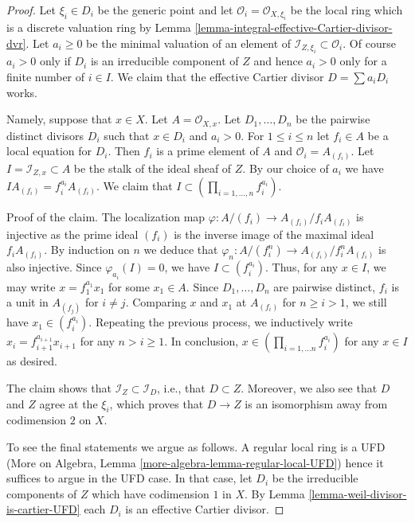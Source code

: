 \documentclass[10pt,a4paper]{amsart}
\theoremstyle{plain}
\theoremstyle{definition}
\theoremstyle{remark}
\numberwithin{equation}{subsection}
\begin{document}
\begin{proof}
Let $\xi_i \in D_i$ be the generic point and let
$\mathcal{O}_i = \mathcal{O}_{X, \xi_i}$ be the local ring
which is a discrete valuation ring by
Lemma \ref{lemma-integral-effective-Cartier-divisor-dvr}.
Let $a_i \geq 0$ be the minimal valuation of an element of
$\mathcal{I}_{Z, \xi_i} \subset \mathcal{O}_i$.
Of course $a_i > 0$ only if $D_i$ is an irreducible component
of $Z$ and hence $a_i > 0$ only for a finite number of $i \in I$.
We claim that the effective Cartier divisor $D = \sum a_i D_i$ works.

\medskip\noindent
Namely, suppose that $x \in X$. Let $A = \mathcal{O}_{X, x}$.
Let $D_1, \ldots, D_n$ be the pairwise distinct divisors
$D_i$ such that $x \in D_i$ and $a_i > 0$.
For $1 \leq i \leq n$ let $f_i \in A$ be a local equation for $D_i$.
Then $f_i$ is a prime element of $A$ and $\mathcal{O}_i = A_{(f_i)}$. Let
$I = \mathcal{I}_{Z, x} \subset A$ be the stalk of the
ideal sheaf of $Z$. By our choice of $a_i$ we have
$I A_{(f_i)} = f_i^{a_i}A_{(f_i)}$. We claim that
$I \subset (\prod_{i = 1, \ldots, n} f_i^{a_i})$.

\medskip\noindent
Proof of the claim. The localization map
$\varphi : A/(f_i) \to A_{(f_i)}/f_iA_{(f_i)}$ is injective as
the prime ideal $(f_i)$ is the inverse image of the maximal ideal
$f_iA_{(f_i)}$. By induction on $n$ we deduce that
$\varphi_n : A/(f_i^n)\to A_{(f_i)}/f_i^nA_{(f_i)}$ is also injective.
Since $\varphi_{a_i}(I) = 0$, we have $I \subset (f_i^{a_i})$.
Thus, for any $x \in I$, we may write $x = f_1^{a_1}x_1$
for some $x_1 \in A$. Since $D_1, \ldots, D_n$ are pairwise
distinct, $f_i$ is a unit in $A_{(f_j)}$ for $i \not = j$.
Comparing $x$ and $x_1$ at $A_{(f_i)}$
for $n \geq i > 1$, we still have $x_1 \in (f_i^{a_i})$.
Repeating the previous process, we inductively write
$x_i = f_{i + 1}^{a_{i + 1}}x_{i + 1}$ for any $n > i \geq 1$.
In conclusion, $x \in (\prod_{i = 1, \ldots n} f_i^{a_i})$
for any $x \in I$ as desired.

\medskip\noindent
The claim shows that $\mathcal{I}_Z \subset \mathcal{I}_D$, i.e., that
$D \subset Z$. Moreover, we also see that $D$ and $Z$ agree at the $\xi_i$,
which proves that $D \to Z$ is an isomorphism away from codimension $2$ on $X$.

\medskip\noindent
To see the final statements we argue as follows. A regular local
ring is a UFD (More on Algebra, Lemma
\ref{more-algebra-lemma-regular-local-UFD}) hence it suffices
to argue in the UFD case. In that case, let
$D_i$ be the irreducible components of $Z$
which have codimension $1$ in $X$.
By Lemma \ref{lemma-weil-divisor-is-cartier-UFD} each $D_i$
is an effective Cartier divisor.
\end{proof}
\end{document}
